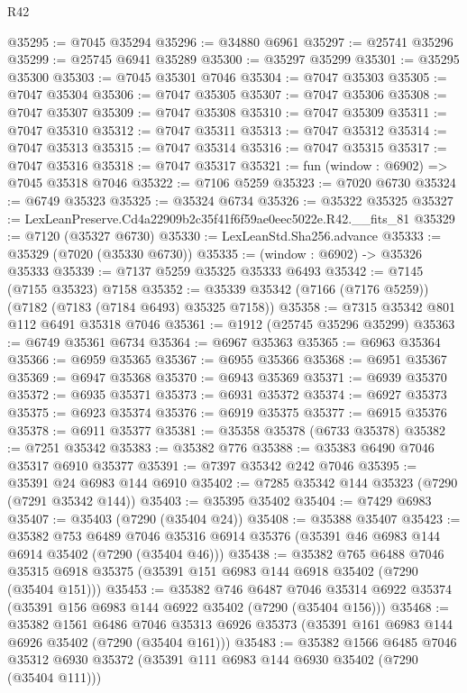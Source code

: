 \begin{lexlean}{R42}
\begin{coremodule}
{@35295 := @7045 @35294
@35296 := @34880 @6961
@35297 := @25741 @35296
@35299 := @25745 @6941 @35289
@35300 := @35297 @35299
@35301 := @35295 @35300
@35303 := @7045 @35301 @7046
@35304 := @7047 @35303
@35305 := @7047 @35304
@35306 := @7047 @35305
@35307 := @7047 @35306
@35308 := @7047 @35307
@35309 := @7047 @35308
@35310 := @7047 @35309
@35311 := @7047 @35310
@35312 := @7047 @35311
@35313 := @7047 @35312
@35314 := @7047 @35313
@35315 := @7047 @35314
@35316 := @7047 @35315
@35317 := @7047 @35316
@35318 := @7047 @35317
@35321 := fun (window : @6902) => @7045 @35318 @7046
@35322 := @7106 @5259
@35323 := @7020 @6730
@35324 := @6749 @35323
@35325 := @35324 @6734
@35326 := @35322 @35325
@35327 := LexLeanPreserve.Cd4a22909b2c35f41f6f59ae0eec5022e.R42.__fits_81
@35329 := @7120 (@35327 @6730)
@35330 := LexLeanStd.Sha256.advance
@35333 := @35329 (@7020 (@35330 @6730))
@35335 := (window : @6902) -> @35326 @35333
@35339 := @7137 @5259 @35325 @35333 @6493
@35342 := @7145 (@7155 @35323) @7158
@35352 := @35339 @35342 (@7166 (@7176 @5259)) (@7182 (@7183 (@7184 @6493) @35325 @7158))
@35358 := @7315 @35342 @801 @112 @6491 @35318 @7046
@35361 := @1912 (@25745 @35296 @35299)
@35363 := @6749 @35361 @6734
@35364 := @6967 @35363
@35365 := @6963 @35364
@35366 := @6959 @35365
@35367 := @6955 @35366
@35368 := @6951 @35367
@35369 := @6947 @35368
@35370 := @6943 @35369
@35371 := @6939 @35370
@35372 := @6935 @35371
@35373 := @6931 @35372
@35374 := @6927 @35373
@35375 := @6923 @35374
@35376 := @6919 @35375
@35377 := @6915 @35376
@35378 := @6911 @35377
@35381 := @35358 @35378 (@6733 @35378)
@35382 := @7251 @35342
@35383 := @35382 @776
@35388 := @35383 @6490 @7046 @35317 @6910 @35377
@35391 := @7397 @35342 @242 @7046
@35395 := @35391 @24 @6983 @144 @6910
@35402 := @7285 @35342 @144 @35323 (@7290 (@7291 @35342 @144))
@35403 := @35395 @35402
@35404 := @7429 @6983
@35407 := @35403 (@7290 (@35404 @24))
@35408 := @35388 @35407
@35423 := @35382
    @753
    @6489
    @7046
    @35316
    @6914
    @35376
    (@35391 @46 @6983 @144 @6914 @35402 (@7290 (@35404 @46)))
@35438 := @35382
    @765
    @6488
    @7046
    @35315
    @6918
    @35375
    (@35391 @151 @6983 @144 @6918 @35402 (@7290 (@35404 @151)))
@35453 := @35382
    @746
    @6487
    @7046
    @35314
    @6922
    @35374
    (@35391 @156 @6983 @144 @6922 @35402 (@7290 (@35404 @156)))
@35468 := @35382
    @1561
    @6486
    @7046
    @35313
    @6926
    @35373
    (@35391 @161 @6983 @144 @6926 @35402 (@7290 (@35404 @161)))
@35483 := @35382
    @1566
    @6485
    @7046
    @35312
    @6930
    @35372
    (@35391 @111 @6983 @144 @6930 @35402 (@7290 (@35404 @111)))
}
\end{coremodule}
\end{lexlean}
